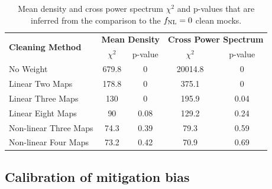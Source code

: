 \begin{table}
  \caption{Mean density and cross power spectrum $\chi^{2}$ and p-values that are inferred from the comparison to the $f_{\rm NL}=0$ clean mocks.}\label{tab:chi2test}
  \begin{tabular}{lcccc}
    \hline
    \hline
    \multirow{2}{*}{\textbf{Cleaning Method}} &
      \multicolumn{2}{c}{\textbf{Mean Density}} &
      \multicolumn{2}{c}{\textbf{Cross Power Spectrum}} \\
    & $\chi^{2}$ & p-value & $\chi^{2}$ & p-value \\
    \hline
   No Weight & 679.8 & 0 & 20014.8 & 0 \\
   Linear Two Maps & 178.8 & 0 & 375.1 & 0\\
   Linear Three Maps & 130 & 0 & 195.9 & 0.04\\
   Linear Eight Maps & 90 & 0.08 & 129.2 & 0.24\\
   Non-linear Three Maps & 74.3 & 0.39  & 79.3 & 0.59\\
   Non-linear Four Maps & 73.2 & 0.42 & 70.9 & 0.69\\    
    \hline
  \end{tabular}
\end{table}


\subsection{Calibration of mitigation bias}\label{ssec:calibration}

